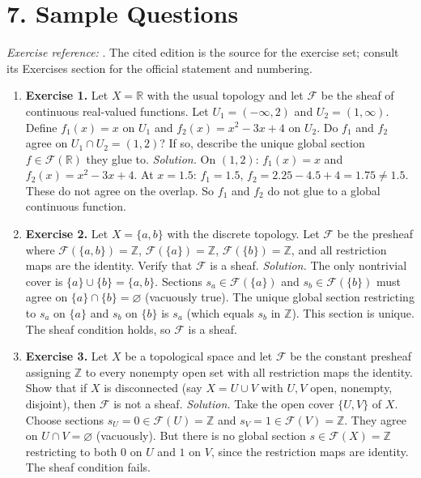 \section*{7. Sample Questions}
\emph{Exercise reference:} \cite{sheaf_ref1}. The cited edition is the source for the exercise set; consult its Exercises section for the official statement and numbering.
\begin{enumerate}[leftmargin=*,itemsep=0.9em]
\item \textbf{Exercise 1.} Let $X=\mathbb{R}$ with the usual topology and let $\mathcal{F}$ be the sheaf of continuous real-valued functions. Let $U_1=(-\infty,2)$ and $U_2=(1,\infty)$. Define $f_1(x)=x$ on $U_1$ and $f_2(x)=x^2-3x+4$ on $U_2$. Do $f_1$ and $f_2$ agree on $U_1\cap U_2=(1,2)$? If so, describe the unique global section $f\in\mathcal{F}(\mathbb{R})$ they glue to. \emph{Solution.} On $(1,2)$: $f_1(x)=x$ and $f_2(x)=x^2-3x+4$. At $x=1.5$: $f_1=1.5$, $f_2=2.25-4.5+4=1.75\ne 1.5$. These do not agree on the overlap. So $f_1$ and $f_2$ do not glue to a global continuous function.

\item \textbf{Exercise 2.} Let $X=\{a,b\}$ with the discrete topology. Let $\mathcal{F}$ be the presheaf where $\mathcal{F}(\{a,b\})=\mathbb{Z}$, $\mathcal{F}(\{a\})=\mathbb{Z}$, $\mathcal{F}(\{b\})=\mathbb{Z}$, and all restriction maps are the identity. Verify that $\mathcal{F}$ is a sheaf. \emph{Solution.} The only nontrivial cover is $\{a\}\cup\{b\}=\{a,b\}$. Sections $s_a\in\mathcal{F}(\{a\})$ and $s_b\in\mathcal{F}(\{b\})$ must agree on $\{a\}\cap\{b\}=\varnothing$ (vacuously true). The unique global section restricting to $s_a$ on $\{a\}$ and $s_b$ on $\{b\}$ is $s_a$ (which equals $s_b$ in $\mathbb{Z}$). This section is unique. The sheaf condition holds, so $\mathcal{F}$ is a sheaf.

\item \textbf{Exercise 3.} Let $X$ be a topological space and let $\mathcal{F}$ be the constant presheaf assigning $\mathbb{Z}$ to every nonempty open set with all restriction maps the identity. Show that if $X$ is disconnected (say $X=U\cup V$ with $U,V$ open, nonempty, disjoint), then $\mathcal{F}$ is not a sheaf. \emph{Solution.} Take the open cover $\{U,V\}$ of $X$. Choose sections $s_U=0\in\mathcal{F}(U)=\mathbb{Z}$ and $s_V=1\in\mathcal{F}(V)=\mathbb{Z}$. They agree on $U\cap V=\varnothing$ (vacuously). But there is no global section $s\in\mathcal{F}(X)=\mathbb{Z}$ restricting to both $0$ on $U$ and $1$ on $V$, since the restriction maps are identity. The sheaf condition fails.


\end{enumerate}
